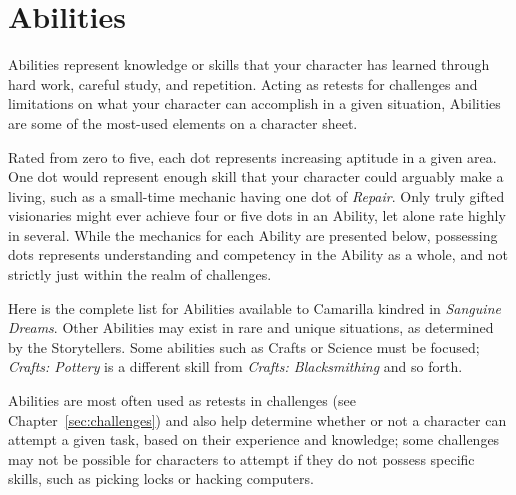 \section{Abilities}
\label{sec:abilities}
Abilities represent knowledge or skills that your character has learned through 
hard work, careful study, and repetition.  Acting as retests for challenges and 
limitations on what your character can accomplish in a given situation, Abilities 
are some of the most-used elements on a character sheet. 

Rated from zero to five, each dot represents increasing aptitude in a given area.  
One dot would represent enough skill that your character could arguably make a 
living, such as a small-time mechanic having one dot of \emph{Repair}.  Only truly 
gifted visionaries might ever achieve four or five dots in an Ability, let alone rate 
highly in several. While the mechanics for each Ability are presented below, possessing 
dots represents understanding and competency in the Ability as a whole, and not strictly 
just within the realm of challenges.

Here is the complete list for Abilities available to Camarilla kindred in 
\emph{Sanguine Dreams}.  Other Abilities may exist in rare and unique situations, 
as determined by the Storytellers.  Some abilities such as Crafts or Science must be 
focused; \emph{Crafts: Pottery} is a different skill from \emph{Crafts: Blacksmithing} 
and so forth.

Abilities are most often used as retests in challenges (see Chapter~\ref{sec:challenges}) 
and also help determine whether or not a character can attempt a given task, based on 
their experience and knowledge; some challenges may not be possible for characters to 
attempt if they do not possess specific skills, such as picking locks or hacking computers.  \\

